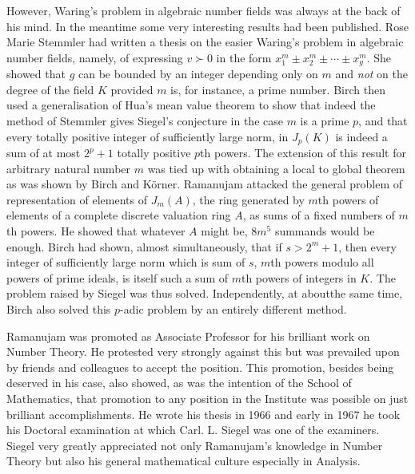 However, Waring's problem in algebraic number fields was always at the 
back of his mind. In the meantime some very interesting results had 
been published. Rose Marie Stemmler had written a thesis on the easier 
Waring's problem in algebraic number fields, namely, of expressing 
$v\succ 0$ in the form $x_1^m\pm x_2^m\pm\cdots\pm x_g^m$. She showed 
that $g$ can be bounded by an integer depending only on $m$ and 
\emph{not} on the degree of the field $K$ provided $m$ is, for 
instance, a prime number. Birch then used a generalisation of Hua's 
mean value theorem to show that indeed the method of Stemmler gives 
Siegel's conjecture in the case $m$ is a prime $p$, and that every 
totally positive integer of sufficiently large norm, in $J_p(K)$ is 
indeed a sum of at most $2^p+1$ totally positive $p$th powers. The 
extension of this result for arbitrary natural number $m$ was tied up 
with obtaining a local to global theorem as was shown by Birch and 
K\"orner. Ramanujam attacked the general problem of representation of 
elements of $J_m(A)$, the ring generated by $m$th powers of elements 
of a complete discrete valuation ring $A$, as sums of a fixed numbers 
of $m$th powers. He showed that whatever $A$ might be, $8m^5$ summands 
would be enough. Birch had shown, almost simultaneously, that if 
$s>2^m +1$, then every integer of sufficiently large norm which is sum 
of $s$, $m$th powers modulo all powers of prime ideals, is itself such a 
sum of $m$th powers of integers in $K$. The problem raised by Siegel 
was thus solved. Independently, at about\pageoriginale the same time, 
Birch also solved this $p$-adic problem by an entirely different 
method.

Ramanujam was promoted as Associate Professor for his brilliant work 
on Number Theory. He protested very strongly against this but was 
prevailed upon by friends and colleagues to accept the position. This 
promotion, besides being deserved in his case, also showed, as was the 
intention of the School of Mathematics, that promotion to any position 
in the Institute was possible on just brilliant accomplishments. He 
wrote his thesis in 1966 and early in 1967 he took his Doctoral 
examination at which Carl. L. Siegel was one of the examiners. Siegel 
very greatly appreciated not only Ramanujam's knowledge in Number 
Theory but also his general mathematical culture especially in 
Analysis.

